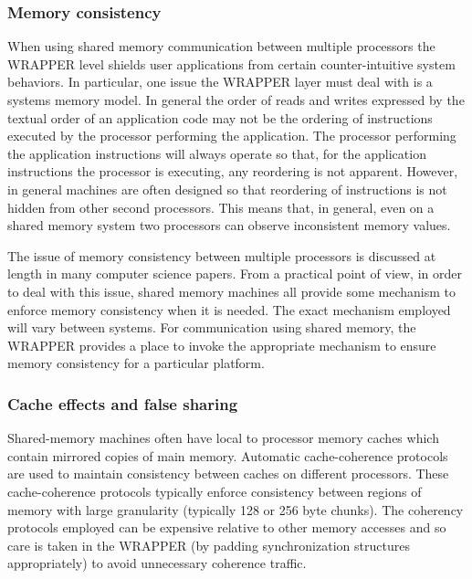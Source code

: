 \subsubsection{Memory consistency}
\label{sect:memory_consistency}

When using shared memory communication between multiple processors the
WRAPPER level shields user applications from certain counter-intuitive
system behaviors.  In particular, one issue the WRAPPER layer must
deal with is a systems memory model.  In general the order of reads
and writes expressed by the textual order of an application code may
not be the ordering of instructions executed by the processor
performing the application.  The processor performing the application
instructions will always operate so that, for the application
instructions the processor is executing, any reordering is not
apparent.  However, in general machines are often designed so that
reordering of instructions is not hidden from other second processors.
This means that, in general, even on a shared memory system two
processors can observe inconsistent memory values.

The issue of memory consistency between multiple processors is
discussed at length in many computer science papers.  From a practical
point of view, in order to deal with this issue, shared memory
machines all provide some mechanism to enforce memory consistency when
it is needed.  The exact mechanism employed will vary between systems.
For communication using shared memory, the WRAPPER provides a place to
invoke the appropriate mechanism to ensure memory consistency for a
particular platform.

\subsubsection{Cache effects and false sharing}
\label{sect:cache_effects_and_false_sharing}

Shared-memory machines often have local to processor memory caches
which contain mirrored copies of main memory.  Automatic cache-coherence
protocols are used to maintain consistency between caches on different
processors.  These cache-coherence protocols typically enforce consistency
between regions of memory with large granularity (typically 128 or 256 byte
chunks).  The coherency protocols employed can be expensive relative to other
memory accesses and so care is taken in the WRAPPER (by padding synchronization
structures appropriately) to avoid unnecessary coherence traffic.

